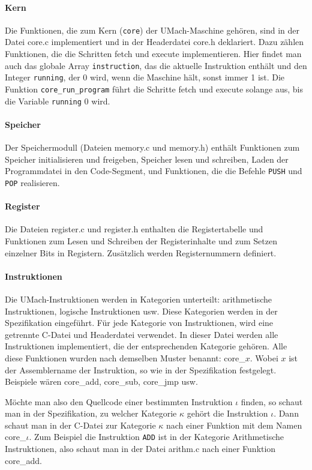 \paragraph{Kern}
Die Funktionen, die zum Kern (\texttt{core}) der UMach-Maschine gehören, sind in
der Datei core.c implementiert und in der Headerdatei core.h deklariert. Dazu
zählen Funktionen, die die Schritten fetch und execute implementieren. Hier
findet man auch das globale Array \texttt{instruction}, das die aktuelle
Instruktion enthält und den Integer \texttt{running}, der 0 wird, wenn die
Maschine hält, sonst immer 1 ist. Die Funktion \texttt{core\_run\_program} führt
die Schritte fetch und execute solange aus, bis die Variable \texttt{running} 0
wird.

\paragraph{Speicher}
Der Speichermodull (Dateien memory.c und memory.h) enthält Funktionen zum
Speicher initialisieren und freigeben, Speicher lesen und schreiben, Laden der
Programmdatei in den Code-Segment, und Funktionen, die die Befehle
\texttt{PUSH} und \texttt{POP} realisieren.

\paragraph{Register}
Die Dateien register.c und register.h enthalten die Registertabelle und
Funktionen zum Lesen und Schreiben der Registerinhalte und zum Setzen einzelner
Bits in Registern. Zusätzlich werden Registernummern definiert.

\paragraph{Instruktionen}
Die UMach-Instruktionen werden in Kategorien unterteilt: arithmetische
Instruktionen, logische Instruktionen usw. Diese Kategorien werden in der
Spezifikation eingeführt. Für jede Kategorie von Instruktionen, wird eine
getrennte C-Datei und Headerdatei verwendet. In dieser Datei werden alle
Instruktionen implementiert, die der entsprechenden Kategorie gehören. Alle
diese Funktionen wurden nach demselben Muster benannt: \glqq{}core\_$x$\grqq{}.
Wobei $x$ ist der Assemblername der Instruktion, so wie in der Spezifikation
festgelegt. Beispiele wären \glqq{}core\_add\grqq{}, \glqq{}core\_sub\grqq{},
\glqq{}core\_jmp\grqq{} usw.

Möchte man also den Quellcode einer bestimmten Instruktion $\iota$ finden, so
schaut man in der Spezifikation, zu welcher Kategorie $\kappa$ gehört die
Instruktion $\iota$. Dann schaut man in der C-Datei zur Kategorie $\kappa$ nach
einer Funktion mit dem Namen \glqq{}core\_$\iota$\grqq{}. Zum Beispiel die
Instruktion \texttt{ADD} ist in der Kategorie \glqq{}Arithmetische
Instruktionen\grqq{}, also schaut man in der Datei arithm.c nach einer Funktion
core\_add.

